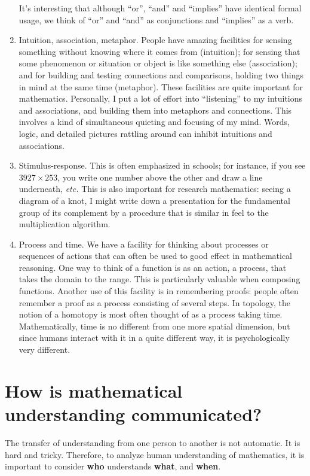 \documentclass[12pt,oneside]{amsart}
\begin{document}
\begin{enumerate}
It's interesting that although ``or'', ``and''
and ``implies'' have identical formal usage, we think of 
``or'' and ``and''
as conjunctions and ``implies'' as a verb.
\item  Intuition, association, metaphor.  People have 
amazing 
facilities for sensing something without knowing where it 
comes 
from (intuition); for sensing that some phenomenon or 
situation or 
object is like something else (association); and for 
building and testing connections 
and comparisons, holding two things in mind at the same 
time (metaphor).
These facilities are quite important for mathematics.  
Personally, I put a lot of effort into ``listening'' to my 
intuitions and 
associations, and building them into metaphors and 
connections. This involves
a kind of simultaneous quieting and focusing of
my mind.  Words, logic, and detailed pictures rattling 
around can inhibit
intuitions and associations.
\item Stimulus-response.  This is often emphasized in 
schools; for instance, if you see $3927 \times 253$,  you 
write one number above the other and draw a line 
underneath, {\it etc.}
This is also important for research mathematics: seeing a 
diagram of a 
knot, I might write down a presentation for the 
fundamental group of its 
complement by a procedure that is similar in feel to the 
multiplication
algorithm.
\item  Process and time.  We have a facility for thinking 
about
processes or sequences of actions that can often be used 
to good effect 
in mathematical reasoning. One way to think of a function 
is as an 
action, a process, that takes the domain to the range.  
This is particularly
valuable when composing functions.  Another use of this 
facility is in remembering proofs:  people often remember 
a proof as a process
consisting of several steps. In topology, the notion of a 
homotopy is 
most often thought of as a process taking time.   
Mathematically, time is 
no different from one more spatial dimension, but since 
humans interact 
with it in a quite different way, it is psychologically 
very different.
\end{enumerate}

\section{How is mathematical understanding communicated?}

The transfer of understanding from one person
to another is not automatic. It is hard and tricky.
Therefore, to analyze human understanding of mathematics, 
it is
important to consider {\bf who} understands {\bf what}, 
and {\bf when}.
\end{document}
